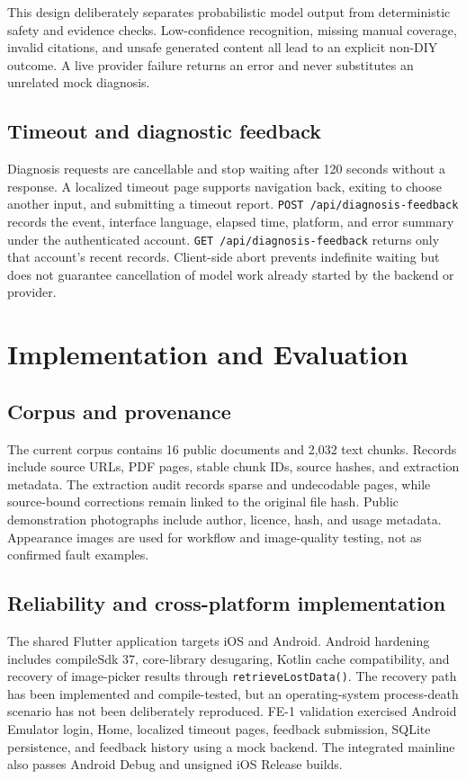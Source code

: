 \documentclass[10.5pt,a4paper]{article}
\begin{document}
This design deliberately separates probabilistic model output from deterministic safety and evidence checks. Low-confidence recognition, missing manual coverage, invalid citations, and unsafe generated content all lead to an explicit non-DIY outcome. A live provider failure returns an error and never substitutes an unrelated mock diagnosis.

\subsection{Timeout and diagnostic feedback}

Diagnosis requests are cancellable and stop waiting after 120 seconds without a response. A localized timeout page supports navigation back, exiting to choose another input, and submitting a timeout report. \texttt{POST /api/diagnosis-feedback} records the event, interface language, elapsed time, platform, and error summary under the authenticated account. \texttt{GET /api/diagnosis-feedback} returns only that account's recent records. Client-side abort prevents indefinite waiting but does not guarantee cancellation of model work already started by the backend or provider.

\section{Implementation and Evaluation}

\subsection{Corpus and provenance}

The current corpus contains 16 public documents and 2,032 text chunks. Records include source URLs, PDF pages, stable chunk IDs, source hashes, and extraction metadata. The extraction audit records sparse and undecodable pages, while source-bound corrections remain linked to the original file hash. Public demonstration photographs include author, licence, hash, and usage metadata. Appearance images are used for workflow and image-quality testing, not as confirmed fault examples.

\subsection{Reliability and cross-platform implementation}

The shared Flutter application targets iOS and Android. Android hardening includes compileSdk 37, core-library desugaring, Kotlin cache compatibility, and recovery of image-picker results through \texttt{retrieveLostData()}. The recovery path has been implemented and compile-tested, but an operating-system process-death scenario has not been deliberately reproduced. FE-1 validation exercised Android Emulator login, Home, localized timeout pages, feedback submission, SQLite persistence, and feedback history using a mock backend. The integrated mainline also passes Android Debug and unsigned iOS Release builds.
\end{document}

